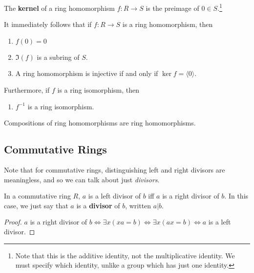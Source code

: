   \begin{definition}[Kernel]
    The \textbf{kernel} of a ring homomorphism $f: R \rightarrow S$ is the preimage of $0 \in S$.\footnote{Note that this is the additive identity, not the multiplicative identity. We must specify which identity, unlike a group which has just one identity.}
  \end{definition}

  \begin{lemma}
    It immediately follows that if $f: R \rightarrow S$ is a ring homomorphism, then 
    \begin{enumerate}
      \item $f(0) = 0$ 
      \item $\Im(f)$ is a subring of $S$. 
      \item A ring homomorphism is injective if and only if $\ker{f} = \langle 0 \rangle $.  
    \end{enumerate}
    Furthermore, if $f$ is a ring isomorphism, then 
    \begin{enumerate}
      \item $f^{-1}$ is a ring isomorphism. 
    \end{enumerate}
  \end{lemma}

  \begin{theorem}
    Compositions of ring homomorphisms are ring homomorphisms. 
  \end{theorem} 

\subsection{Commutative Rings} 

  Note that for commutative rings, distinguishing left and right divisors are meaningless, and so we can talk about just \textit{divisors}. 

  \begin{lemma}[Left=Right Divisors]
    In a commutative ring $R$, $a$ is a left divisor of $b$ iff $a$ is a right divisor of $b$. In this case, we just say that $a$ is a \textbf{divisor} of $b$, written $a | b$. 
  \end{lemma}
  \begin{proof}
    $a$ is a right divisor of $b \iff \exists x (xa = b) \iff \exists x (ax = b) \iff a$ is a left divisor. 
  \end{proof} 


